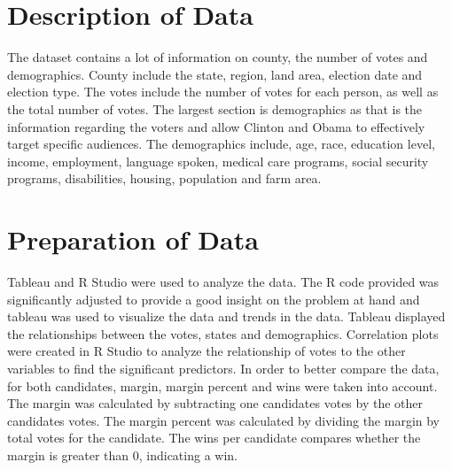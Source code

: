 \documentclass[11pt]{article}
\begin{document}
\section{Description of Data}
The dataset contains a lot of information on county, the number of votes and demographics. County include the state, region, land area, election date and election type. The votes include the number of votes for each person, as well as the total number of votes.  The largest section is demographics as that is the information regarding the voters and allow Clinton and Obama to effectively target specific audiences. The demographics include, age, race, education level, income, employment, language spoken, medical care programs, social security programs, disabilities, housing, population and farm area.

\section{Preparation of Data}
Tableau and R Studio were used to analyze the data. The R code provided was significantly adjusted to provide a good insight on the problem at hand and tableau was used to visualize the data and trends in the data. Tableau displayed the relationships between the votes, states and demographics. Correlation plots were created in R Studio to analyze the relationship of votes to the other variables to find the significant predictors. In order to better compare the data, for both candidates, margin, margin percent and wins were taken into account. The margin was calculated by subtracting one candidates votes by the other candidates votes. The margin percent was calculated by dividing the margin by total votes for the candidate. The wins per candidate compares whether the margin is greater than 0, indicating a win. 
\end{document}
